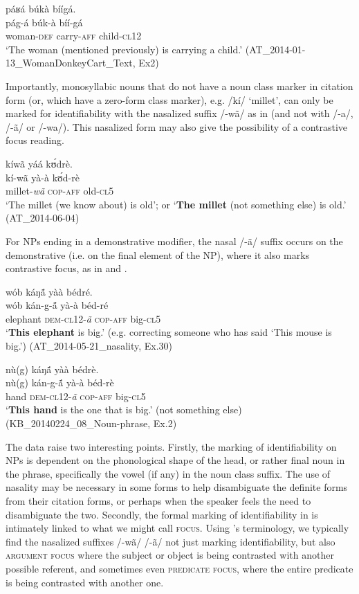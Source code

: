 \documentclass[output=paper]{langsci/langscibook}
\begin{document}
\ea\label{ex:teo:51}
\glll páʁá búkà bíígá.\\
pág-á búk-à bíí-gá\\
woman-\textsc{def} carry-\textsc{aff} child-\textsc{cl12}\\
\glt ‘The woman (mentioned previously) is carrying a child.’ (AT\_2014-01-13\_WomanDonkeyCart\_Text, Ex2)
\z

Importantly, monosyllabic nouns that do not have a noun class marker in citation form (or, which have a zero-form class marker), e.g. /kí/ ‘millet’, can only be marked for identifiability with the nasalized suffix /-wã/ as in  (and not with /-a/, /-ã/ or /-wa/). This nasalized form may also give the possibility of a contrastive focus reading.

\ea\label{ex:teo:52}
\glll kíwã  yáá k\'ʊdrè.\\
kí-wã  yà-à k\'ʊd-rè\\
millet-\textit{wã} \textsc{cop-aff} old-\textsc{cl5}\\
\glt ‘The millet (we know about) is old’; or ‘\textbf{The millet} (not something else) is old.’ (AT\_2014-06-04)
\z

For NPs ending in a demonstrative modifier, the nasal /-ã/ suffix occurs on the demonstrative (i.e. on the final element of the NP), where it also marks contrastive focus, as in  and .

\ea\label{ex:teo:53}
\glll wób káŋ\'{ã} yàà bédré.\\
wób kán-g-\'{ã} yà-à béd-ré\\
elephant \textsc{dem-cl12}-\textit{ã} \textsc{cop-aff} big-\textsc{cl5}\\
\glt ‘\textbf{This elephant} is big.’ (e.g. correcting someone who has said ‘This mouse is big.’) (AT\_2014-05-21\_nasality, Ex.30)
\z

\ea\label{ex:teo:54}
\glll nù(g) káŋ\'{ã}  yàà bédrè.\\
nù(g) kán-g-\'{ã}  yà-à béd-rè\\
hand \textsc{dem-cl12}-\textit{ã} \textsc{cop-aff} big-\textsc{cl5}\\
\glt ‘\textbf{This hand} is the one that is big.’ (not something else) (KB\_20140224\_08\_Noun-phrase, Ex.2)
\z

The data raise two interesting points. Firstly, the marking of identifiability on NPs is dependent on the phonological shape of the head, or rather final noun in the phrase, specifically the vowel (if any) in the noun class suffix. The use of nasality may be necessary in some forms to help disambiguate the definite forms from their citation forms, or perhaps when the speaker feels the need to disambiguate the two. Secondly, the formal marking of identifiability in  is intimately linked to what we might call \textsc{focus}. Using \cite{Lambrecht1994}'s terminology, we typically find the nasalized suffixes /-wã/ {\Tilde} /-ã/ not just marking identifiability, but also \textsc{argument focus} where the subject or object is being contrasted with another possible referent, and sometimes even \textsc{predicate focus}, where the entire predicate is being contrasted with another one.
\end{document}

